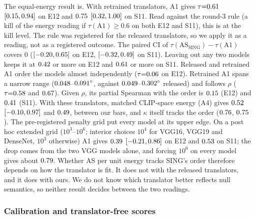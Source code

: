 \documentclass[10pt]{article}
\newcommand{\ASS}{\mathrm{AS}_{\mathrm{SING}}}
\begin{document}
The equal-energy result is.
With retrained translators, A1 gives $\tau{=}0.61$ $[0.15,0.94]$ on E12 and $0.75$ $[0.32,1.00]$ on S11.
Read against the round-3 rule (a kill of the energy reading if $\tau(\mathrm{A1})\ge0.6$ on both E12 and S11), this is at the kill level. The rule was registered for the released translators, so we apply it as a reading, not as a registered outcome.
The paired CI of $\tau(\ASS)-\tau(\mathrm{A1})$ covers 0 ($[-0.20,0.65]$ on E12, $[-0.32,0.49]$ on S11).
Leaving out any two models keeps it at $0.42$ or more on E12 and $0.61$ or more on S11.
Released and retrained A1 order the models almost independently ($\tau{=}0.06$ on E12).
Retrained A1 spans a narrow range ($0.048$--$0.091^\circ$, against $0.049$--$0.302^\circ$ released) and follows $\rho$ ($\tau{=}0.58$ and $0.67$). Given $\rho$, its partial Spearman with the order is $0.15$ (E12) and $0.41$ (S11).
With these translators, matched CLIP-space energy (A4) gives $0.52$ $[-0.10,0.97]$ and $0.49$, between our bars, and $\kappa$ itself tracks the order ($0.76$, $0.75$).
The pre-registered penalty grid put every model at its upper edge. On a post hoc extended grid ($10^{3}$--$10^{6}$; interior choices $10^4$ for VGG16, VGG19 and DenseNet, $10^3$ otherwise) A1 gives $0.39$ $[-0.21,0.86]$ on E12 and $0.53$ on S11; the drop comes from the two VGG models alone, and forcing $10^6$ on every model gives about $0.79$.
Whether AS per unit energy tracks SING's order therefore depends on how the translator is fit. It does not with the released translators, and it does with ours.
We do not know which translator better reflects null semantics, so neither result decides between the two readings.

\subsubsection{Calibration and translator-free scores}
\label{sec:calib}
\end{document}
